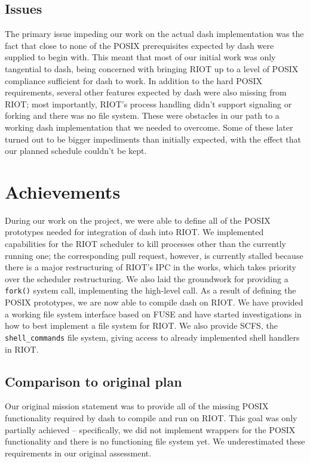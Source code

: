 \documentclass[conference]{IEEEtran}
\begin{document}
\subsection{Issues}
\label{sub:Issues}
The primary issue impeding our work on the actual dash implementation
was the fact that close to none of the POSIX prerequisites expected by
dash were supplied to begin with. This meant that most of our initial
work was only tangential to dash, being concerned with bringing RIOT up
to a level of POSIX compliance sufficient for dash to work. In addition
to the hard POSIX requirements, several other features expected by dash
were also missing from RIOT; most importantly, RIOT's process handling
didn't support signaling or forking and there was no file system. These
were obstacles in our path to a working dash implementation that we
needed to overcome. Some of these later turned out to be bigger
impediments than initially expected, with the effect that our planned
schedule couldn't be kept.

\section{Achievements}
\label{sec:Achievements}
During our work on the project, we were able to define all of the POSIX
prototypes needed for integration of dash into RIOT. We implemented
capabilities for the RIOT scheduler to kill processes other than the
currently running one; the corresponding pull request, however, is
currently stalled because there is a major restructuring of RIOT's IPC
in the works, which takes priority over the scheduler restructuring. We
also laid the groundwork for providing a \texttt{fork()} system call,
implementing the high-level call. As a result of defining the POSIX
prototypes, we are now able to compile dash on RIOT. We have provided
a working file system interface based on FUSE and have started
investigations in how to best implement a file system for RIOT. We also
provide SCFS, the \texttt{shell\_commands} file system, giving access to
already implemented shell handlers in RIOT.

\subsection{Comparison to original plan}
\label{sub:Comparison to original plan}
Our original mission statement was to provide all of the missing POSIX
functionality required by dash to compile and run on RIOT. This goal was
only partially achieved -- specifically, we did not implement wrappers
for the POSIX functionality and there is no functioning file system yet.
We underestimated these requirements in our original assessment.
\end{document}
